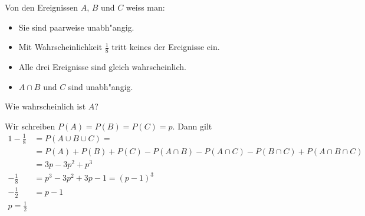 Von den Ereignissen $A$, $B$ und $C$ weiss man:
\begin{itemize}
\item Sie sind paarweise unabh"angig.
\item Mit Wahrscheinlichkeit $\frac18$ tritt keines der
Ereignisse ein.
\item Alle drei Ereignisse sind gleich wahrscheinlich.
\item $A\cap B$ und $C$ sind unabh"angig.
\end{itemize}
Wie wahrscheinlich ist $A$?

\begin{loesung}
Wir schreiben $P(A)=P(B)=P(C)=p$. Dann gilt
\begin{align*}
1-\frac18&=
P(A\cup B\cup C)=
\\
&=P(A)+P(B)+P(C) -P(A\cap B)-P(A\cap C)-P(B\cap C)+P(A\cap B\cap C)
\\
&=3p-3p^2+p^3
\\
-\frac18&=p^3-3p^2+3p-1=(p-1)^3
\\
-\frac12&=p-1\\
p=\frac12
\end{align*}
\end{loesung}

